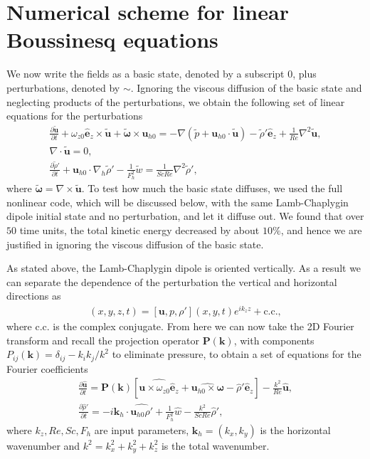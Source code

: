 \section{Numerical scheme for linear Boussinesq equations}
We now write the fields as a basic state, denoted by a subscript $0$, plus perturbations, denoted by $\sim$. Ignoring the viscous diffusion of the basic state \cite{drazinreid} and neglecting products of the perturbations, we obtain the following set of linear equations for the perturbations
\begin{align}
\frac{\partial \tilde{\bm{u}}}{\partial t} + \omega_{z0}\hat{\bm{e}}_{z}\times \tilde{\bm{u}}+\tilde{\boldsymbol{\omega}}\times \bm{u}_{h0} = -\nabla(\tilde{p}+\bm{u}_{h0} \cdot \tilde{\bm{u}}) - \tilde{\rho}'\hat{\bm{e}}_{z} + \frac{1}{Re}\nabla^{2}\tilde{\bm{u}},\label{nsl1}\\
\nabla\cdot\tilde{\bm{u}}=0,\\
\frac{\partial \tilde{\rho}'}{\partial t} + \bm{u}_{h0}\cdot \nabla_{h}\tilde{\rho}'-\frac{1}{F_{h}^{2}}\tilde{w} = \frac{1}{ScRe}\nabla^{2}\tilde{\rho}',\label{nsl3}
\end{align}
where $\tilde{\boldsymbol{\omega}}=\nabla \times \tilde{\bm{u}}$. To test how much the basic state diffuses, we used the full nonlinear code, which will be discussed below, with the same Lamb-Chaplygin dipole initial state and no perturbation, and let it diffuse out. We found that over $50$ time units, the total kinetic energy decreased by about $10\%$, and hence we are justified in ignoring the viscous diffusion of the basic state. 

As stated above, the Lamb-Chaplygin dipole is oriented vertically. As a result we can separate the dependence of the perturbation the vertical and horizontal directions as 
\begin{align} 
[\tilde{\bm{u}},\tilde{p},\tilde{\rho}'](x,y,z,t) = [\bm{u},p,\rho'](x,y,t)e^{ik_{z}z} + \text{c.c.},
\end{align}
where c.c. is the complex conjugate. From here we can now take the 2D Fourier transform and recall the projection operator $\textbf{P}(\textbf{k})$, with components $P_{ij}(\textbf{k})=\delta_{ij} - k_{i}k_{j}/k^{2}$ to eliminate pressure, to obtain a set of equations for the Fourier coefficients 
\begin{align}
\frac{\partial \hat{\bm{u}}}{\partial t} = \textbf{P}(\textbf{k})[\widehat{\bm{u}\times \omega_{z0}\hat{\bm{e}}_{z}} + \widehat{\bm{u}_{h0}\times\bm{\omega}}-\hat{\rho}'\hat{\bm{e}}_{z}] - \frac{k^{2}}{Re}\hat{\bm{u}},\label{solve1}\\
\frac{\partial\hat{\rho}'}{\partial t} = -i\bm{k}_{h}\cdot\widehat{\bm{u}_{h0}\rho'} + \frac{1}{F_{h}^{2}}\hat{w}- \frac{k^{2}}{ScRe}\hat{\rho}',\label{solve2}
\end{align}
where $k_{z},Re,Sc,F_{h}$ are input parameters, $\bm{k}_{h}=(k_{x},k_{y})$ is the horizontal wavenumber and $k^{2}=k_{x}^{2}+k_{y}^{2}+k_{z}^{2}$ is the total wavenumber. 

